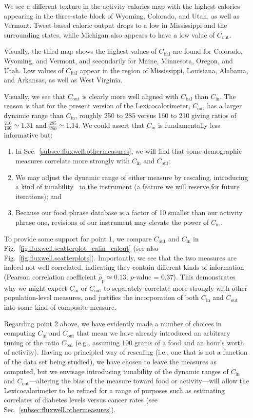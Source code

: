 \documentclass[10pt]{article}
\newcommand{\calin}{C_{\textrm{in}}}
\newcommand{\calout}{C_{\textrm{out}}}
\newcommand{\calbal}{C_{\textrm{bal}}}
\newcommand{\rhopearson}{\hat{\rho}_{\textrm{p}}}
\begin{document}
We see a different texture in the activity calories 
map with the highest calories appearing in the
three-state block of Wyoming, Colorado, and Utah, as well as Vermont.
Tweet-based caloric output drops to a low in Mississippi
and the surrounding states, while Michigan also
appears to have a low value of $\calout$.

Visually, the third map shows the highest values of $\calbal$ 
are found for Colorado, Wyoming, and Vermont, 
and secondarily for Maine, Minnesota, Oregon, and Utah.
Low values of $\calbal$ appear in the region of
Mississippi, Louisiana, Alabama, and Arkansas,
as well as West Virginia.

Visually, we see that $\calout$ is clearly more well aligned
with $\calbal$ than $\calin$.
The reason is that for the present version
of the Lexicocalorimeter,
$\calout$ has a larger dynamic
range than $\calin$,
roughly 250 to 285 versus 160 to 210 
giving ratios of 
$\frac{210}{160} \simeq 1.31$
and
$\frac{285}{250} \simeq 1.14$.
We could assert that $\calin$ is fundamentally less 
informative but: 
\begin{enumerate}
\item 
  In Sec.~\ref{subsec:fluxwell.othermeasures},
  we will find that some demographic measures correlate
  more strongly with $\calin$ and $\calout$;
\item 
  We may adjust the dynamic range of either measure 
  by rescaling, introducing a kind of tunability~\cite{dodds2011e}
  to the instrument (a feature we will reserve for future
  iterations);
  and
\item 
  Because our food phrase database is 
  a factor of 10
  smaller than our activity phrase one,
  revisions of our instrument may elevate
  the power of $\calin$.
\end{enumerate}

To provide some support for point 1, 
we compare $\calout$ and $\calin$ in
Fig.~\ref{fig:fluxwell.scatterplot_calin_calout}
(see also Fig.~\ref{fig:fluxwell.scatterplots}).
Importantly, we see that the two measures are indeed
not well correlated, indicating they contain
different kinds of information
(Pearson correlation coefficient $\rhopearson \simeq 0.13$,
$p$-value = 0.37).
This demonstrates why we might expect 
$\calin$ or $\calout$ to separately correlate
more strongly with other population-level measures,
and justifies the incorporation of both $\calin$ and $\calout$
into some kind of composite measure.

Regarding point 2 above, we have evidently made
a number of choices in computing $\calin$ and $\calout$
that mean we have already introduced an arbitrary tuning
of the ratio $\calbal$
(e.g., assuming 100 grams of a food and an hour's worth of activity).
Having no principled way of rescaling (i.e., one that is not
a function of the data set being studied), 
we have chosen to leave the measures as computed,
but we envisage introducing tunability of the dynamic
ranges of $\calin$ and $\calout$---altering the bias of
the measure toward food or activity---will allow
the Lexicocalorimeter to be refined for 
a range of purposes such as estimating correlates of diabetes levels
versus cancer rates (see Sec.~\ref{subsec:fluxwell.othermeasures}).
\end{document}
